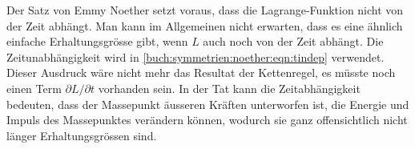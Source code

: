 Der Satz von Emmy Noether setzt voraus, dass die Lagrange-Funktion
nicht von der Zeit abhängt.
Man kann im Allgemeinen nicht erwarten, dass es eine ähnlich einfache
Erhaltungsgrösse gibt, wenn $L$ auch noch von der Zeit abhängt.
Die Zeitunabhängigkeit wird in 
\eqref{buch:symmetrien:noether:eqn:tindep}
verwendet.
Dieser Ausdruck wäre nicht mehr das Resultat der Kettenregel,
es müsste noch einen Term $\partial L/\partial t$ vorhanden sein.
In der Tat kann die Zeitabhängigkeit bedeuten, dass der Massepunkt
äusseren Kräften unterworfen ist, die Energie und Impuls des Massepunktes
verändern können, wodurch sie ganz offensichtlich nicht länger
Erhaltungsgrössen sind.


